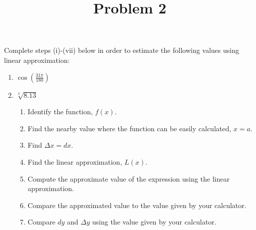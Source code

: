 \documentclass{ximera}
\title[Problem 2]{Problem 2}
\begin{document}
\begin{abstract} \end{abstract}
\maketitle

\begin{problem}

Complete steps (i)-(vii) below in order to estimate the following values using linear approximation:
\begin{enumerate}
	\item $\cos \left( \frac{31 \pi}{180} \right)$	
	\item $\sqrt[3]{8.13} $
\begin{enumerate}
\item Identify the function, $f(x)$.
      \item  Find the nearby value where the function can be easily calculated, $x=a$.
      \item Find $\Delta x=dx$.
      \item  Find the linear approximation, $L(x)$.  
\item  Compute the approximate value of the expression using the linear approximation.
	\item  Compare the approximated value to the value given by your calculator.
      \item  Compare $dy$ and $\Delta y$ using the value given by your calculator.
\end{enumerate}
\end{enumerate}

\end{problem}
\end{document}
